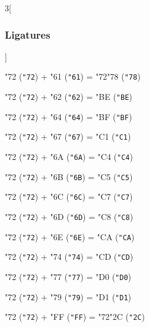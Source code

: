 \documentclass{article}
\begin{document}
\begin{multicols}{3}[\subsubsection{Ligatures}]

{\testfont\char"72\noboundary} ({\tt"72}) + {\testfont\char"61\noboundary} ({\tt"61}) = {\testfont\char"72\noboundary}{\testfont\char"78\noboundary} ({\tt"78}) 

{\testfont\char"72\noboundary} ({\tt"72}) + {\testfont\char"62\noboundary} ({\tt"62}) = {\testfont\char"BE\noboundary} ({\tt"BE}) 

{\testfont\char"72\noboundary} ({\tt"72}) + {\testfont\char"64\noboundary} ({\tt"64}) = {\testfont\char"BF\noboundary} ({\tt"BF}) 

{\testfont\char"72\noboundary} ({\tt"72}) + {\testfont\char"67\noboundary} ({\tt"67}) = {\testfont\char"C1\noboundary} ({\tt"C1}) 

{\testfont\char"72\noboundary} ({\tt"72}) + {\testfont\char"6A\noboundary} ({\tt"6A}) = {\testfont\char"C4\noboundary} ({\tt"C4}) 

{\testfont\char"72\noboundary} ({\tt"72}) + {\testfont\char"6B\noboundary} ({\tt"6B}) = {\testfont\char"C5\noboundary} ({\tt"C5}) 

{\testfont\char"72\noboundary} ({\tt"72}) + {\testfont\char"6C\noboundary} ({\tt"6C}) = {\testfont\char"C7\noboundary} ({\tt"C7}) 

{\testfont\char"72\noboundary} ({\tt"72}) + {\testfont\char"6D\noboundary} ({\tt"6D}) = {\testfont\char"C8\noboundary} ({\tt"C8}) 

{\testfont\char"72\noboundary} ({\tt"72}) + {\testfont\char"6E\noboundary} ({\tt"6E}) = {\testfont\char"CA\noboundary} ({\tt"CA}) 

{\testfont\char"72\noboundary} ({\tt"72}) + {\testfont\char"74\noboundary} ({\tt"74}) = {\testfont\char"CD\noboundary} ({\tt"CD}) 

{\testfont\char"72\noboundary} ({\tt"72}) + {\testfont\char"77\noboundary} ({\tt"77}) = {\testfont\char"D0\noboundary} ({\tt"D0}) 

{\testfont\char"72\noboundary} ({\tt"72}) + {\testfont\char"79\noboundary} ({\tt"79}) = {\testfont\char"D1\noboundary} ({\tt"D1}) 

{\testfont\char"72\noboundary} ({\tt"72}) + {\testfont\char"FF\noboundary} ({\tt"FF}) = {\testfont\char"72\noboundary}{\testfont\char"2C\noboundary} ({\tt"2C}) 

\end{multicols}
\end{document}

